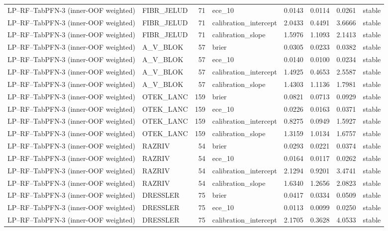 \begin{longtable}{llrlrrrl}
LP--RF--TabPFN-3 (inner-OOF weighted) & FIBR\_JELUD & 71 & ece\_10 & 0.0143 & 0.0114 & 0.0261 & stable \\
LP--RF--TabPFN-3 (inner-OOF weighted) & FIBR\_JELUD & 71 & calibration\_intercept & 2.0433 & 0.4491 & 3.6666 & stable \\
LP--RF--TabPFN-3 (inner-OOF weighted) & FIBR\_JELUD & 71 & calibration\_slope & 1.5976 & 1.1093 & 2.1413 & stable \\
LP--RF--TabPFN-3 (inner-OOF weighted) & A\_V\_BLOK & 57 & brier & 0.0305 & 0.0233 & 0.0382 & stable \\
LP--RF--TabPFN-3 (inner-OOF weighted) & A\_V\_BLOK & 57 & ece\_10 & 0.0140 & 0.0100 & 0.0234 & stable \\
LP--RF--TabPFN-3 (inner-OOF weighted) & A\_V\_BLOK & 57 & calibration\_intercept & 1.4925 & 0.4653 & 2.5587 & stable \\
LP--RF--TabPFN-3 (inner-OOF weighted) & A\_V\_BLOK & 57 & calibration\_slope & 1.4303 & 1.1136 & 1.7981 & stable \\
LP--RF--TabPFN-3 (inner-OOF weighted) & OTEK\_LANC & 159 & brier & 0.0821 & 0.0713 & 0.0929 & stable \\
LP--RF--TabPFN-3 (inner-OOF weighted) & OTEK\_LANC & 159 & ece\_10 & 0.0226 & 0.0163 & 0.0371 & stable \\
LP--RF--TabPFN-3 (inner-OOF weighted) & OTEK\_LANC & 159 & calibration\_intercept & 0.8275 & 0.0949 & 1.5927 & stable \\
LP--RF--TabPFN-3 (inner-OOF weighted) & OTEK\_LANC & 159 & calibration\_slope & 1.3159 & 1.0134 & 1.6757 & stable \\
LP--RF--TabPFN-3 (inner-OOF weighted) & RAZRIV & 54 & brier & 0.0293 & 0.0221 & 0.0374 & stable \\
LP--RF--TabPFN-3 (inner-OOF weighted) & RAZRIV & 54 & ece\_10 & 0.0164 & 0.0117 & 0.0262 & stable \\
LP--RF--TabPFN-3 (inner-OOF weighted) & RAZRIV & 54 & calibration\_intercept & 2.1294 & 0.9201 & 3.4741 & stable \\
LP--RF--TabPFN-3 (inner-OOF weighted) & RAZRIV & 54 & calibration\_slope & 1.6340 & 1.2656 & 2.0823 & stable \\
LP--RF--TabPFN-3 (inner-OOF weighted) & DRESSLER & 75 & brier & 0.0417 & 0.0334 & 0.0509 & stable \\
LP--RF--TabPFN-3 (inner-OOF weighted) & DRESSLER & 75 & ece\_10 & 0.0113 & 0.0099 & 0.0250 & stable \\
LP--RF--TabPFN-3 (inner-OOF weighted) & DRESSLER & 75 & calibration\_intercept & 2.1705 & 0.3628 & 4.0533 & stable \\

\end{longtable}
